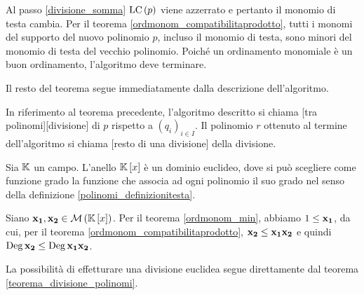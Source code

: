 \Proof Al passo \ref{divisione_somma} $\text{LC} \left ( p \right )$ viene azzerrato e pertanto il monomio di testa cambia. Per il teorema \ref{ordmonom_compatibilitaprodotto}, tutti i monomi del supporto del nuovo polinomio $p$, incluso il monomio di testa, sono minori del monomio di testa del vecchio polinomio. Poich\'e un ordinamento monomiale \`e un buon ordinamento, l'algoritmo deve terminare.
\par Il resto del teorema segue immediatamente dalla descrizione dell'algoritmo. \EndProof
\begin{Definition}
	In riferimento al teorema precedente, l'algoritmo descritto si chiama [tra polinomi][divisione] di $p$ rispetto a $(q_i)_{i \in I}$. Il polinomio $r$ ottenuto al termine dell'algoritmo si chiama [resto di una divisione] della divisione.
\end{Definition}
\begin{Theorem}
	Sia $\mathbb{K}$ un campo. L'anello $\mathbb{K} \left [ x \right ]$ \`e un dominio euclideo, dove si pu\`o scegliere come funzione grado la funzione che associa ad ogni polinomio il suo grado nel senso della definizione \ref{polinomi_definizionitesta}.
\end{Theorem}
\Proof Siano $\mathbf{x_1}, \mathbf{x_2} \in \mathcal{M}\left ( \mathbb{K} \left [ x \right ] \right )$. Per il teorema \ref{ordmonom_min}, abbiamo $1 \leq \mathbf{x_1}$, da cui, per il teorema \ref{ordmonom_compatibilitaprodotto}, $\mathbf{x_2} \leq \mathbf{x_1}\mathbf{x_2}$ e quindi $\operatorname{Deg}{\mathbf{x_2}} \leq \operatorname{Deg}{\mathbf{x_1}\mathbf{x_2}}$.
\par La possibilit\`a di effetturare una divisione euclidea segue direttamente dal teorema \ref{teorema_divisione_polinomi}. \EndProof
